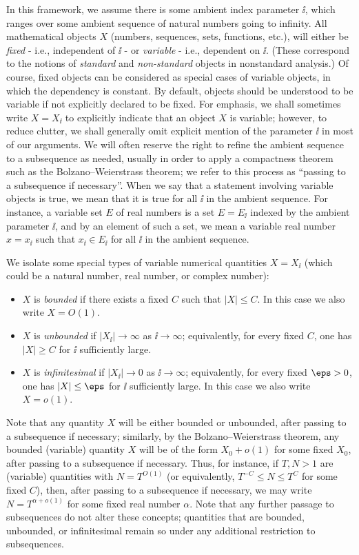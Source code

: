 In this framework, we assume there is some ambient index parameter $\ii$, which ranges over some ambient sequence of natural numbers going to infinity.  All mathematical objects $X$ (numbers, sequences, sets, functions, etc.), will either be \emph{fixed} - i.e., independent of $\ii$ - or \emph{variable} - i.e., dependent on $\ii$.  (These correspond to the notions of \emph{standard} and \emph{non-standard} objects in nonstandard analysis.)  Of course, fixed objects can be considered as special cases of variable objects, in which the dependency is constant.  By default, objects should be understood to be variable if not explicitly declared to be fixed. For emphasis, we shall sometimes write $X = X_{\ii}$ to explicitly indicate that an object $X$ is variable; however, to reduce clutter, we shall generally omit explicit mention of the parameter $\ii$ in most of our arguments. We will often reserve the right to refine the ambient sequence to a subsequence as needed, usually in order to apply a compactness theorem such as the Bolzano--Weierstrass theorem; we refer to this process as ``passing to a subsequence if necessary''.  When we say that a statement involving variable objects is true, we mean that it is true for all $\ii$ in the ambient sequence.
For instance, a variable set $E$ of real numbers is a set $E = E_{\ii}$ indexed by the ambient parameter $\ii$, and by an element of such a set, we mean a variable real number $x = x_{\ii}$ such that $x_{\ii} \in E_{\ii}$ for all $\ii$ in the ambient sequence.

We isolate some special types of variable numerical quantities $X = X_{\ii}$ (which could be a natural number, real number, or complex number):
\begin{itemize}
\item $X$ is \emph{bounded} if there exists a fixed $C$ such that $|X| \leq C$. In this case we also write $X = O(1)$.
\item $X$ is \emph{unbounded} if $|X_{\ii}| \to \infty$ as $\ii \to \infty$; equivalently, for every fixed $C$, one has $|X| \geq C$ for $\ii$ sufficiently large.
\item $X$ is \emph{infinitesimal} if $|X_{\ii}| \to 0$ as $\ii \to \infty$; equivalently, for every fixed $\eps>0$, one has $|X| \leq \eps$ for $\ii$ sufficiently large. In this case we also write $X = o(1)$.
\end{itemize}

Note that any quantity $X$ will be either bounded or unbounded, after passing to a subsequence if necessary; similarly, by the Bolzano--Weierstrass theorem, any bounded (variable) quantity $X$ will be of the form $X_0+o(1)$ for some fixed $X_0$, after passing to a subsequence if necessary.  Thus, for instance, if $T, N > 1$ are (variable) quantities with $N = T^{O(1)}$ (or equivalently, $T^{-C} \leq N \leq T^C$ for some fixed $C$), then, after passing to a subsequence if necessary, we may write $N = T^{\alpha+o(1)}$ for some fixed real number $\alpha$.  Note that any further passage to subsequences do not alter these concepts; quantities that are bounded, unbounded, or infinitesimal remain so under any additional restriction to subsequences.

